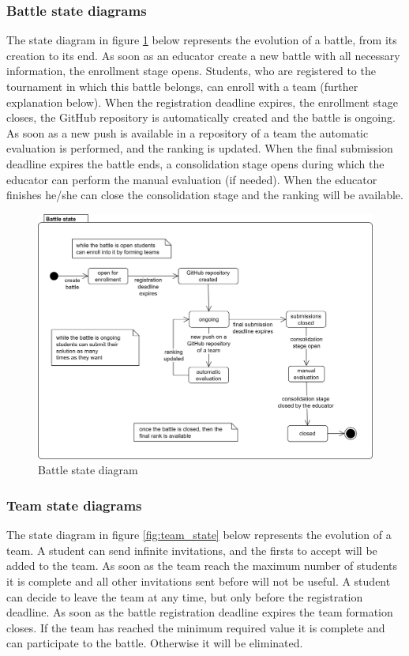 \subsubsection*{Battle state diagrams}
The state diagram in figure \ref{fig:battle_state} below represents the evolution of a battle, from its creation to its end. \newline
As soon as an educator create a new battle with all necessary information, the enrollment stage opens. Students, who are registered to the tournament in which this battle belongs, can enroll with a team (further explanation below). \newline
When the registration deadline expires, the enrollment stage closes, the GitHub repository is automatically created and the battle is ongoing. As soon as a new push is available in a repository of a team the automatic evaluation is performed, and the ranking is updated. \newline
When the final submission deadline expires the battle ends, a consolidation stage opens during which the educator can perform the manual evaluation (if needed). When the educator finishes he/she can close the consolidation stage and the ranking will be available.
\begin{figure}[H]
    \centering
    \includegraphics[scale=0.7]{images/battle_state.png}
    \caption{Battle state diagram}
    \label{fig:battle_state}
\end{figure}

\subsubsection*{Team state diagrams}
The state diagram in figure \ref{fig:team_state} below represents the evolution of a team. \newline
A student can send infinite invitations, and the firsts to accept will be added to the team. As soon as the team reach the maximum number of students it is complete and all other invitations sent before will not be useful.  A student can decide to leave the team at any time, but only before the registration deadline. \newline
As soon as the battle registration deadline expires the team formation closes. If the team has reached the minimum required value it is complete and can participate to the battle. Otherwise it will be eliminated. 

